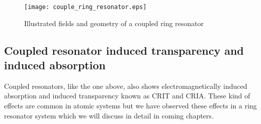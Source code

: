 \begin{figure}[t]
\centering
\texttt{[image: couple\_ring\_resonator.eps]}
\caption{Illustrated fields and geometry of a coupled ring resonator}
\end{figure}

\subsection{Coupled resonator induced transparency and induced absorption}
Coupled resonators, like the one above, also shows electromagnetically induced absorption and induced transparency known as CRIT and CRIA. These kind of effects are common in atomic systems but we have observed these effects in a ring resonator system which we will discuss in detail in coming chapters.
